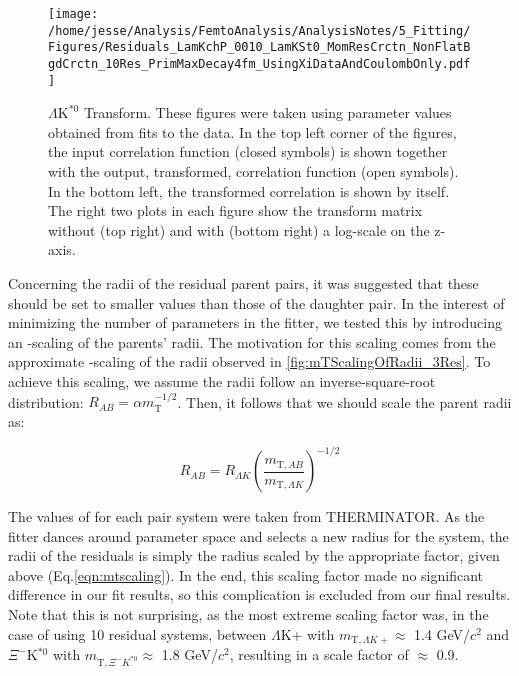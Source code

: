 \documentclass[/home/jesse/Analysis/FemtoAnalysis/AnalysisNotes/AnalysisNoteJBuxton.tex]{subfiles}
\begin{document}
\begin{figure}[h]
  \centering
  \texttt{[image: /home/jesse/Analysis/FemtoAnalysis/AnalysisNotes/5\_Fitting/Figures/Residuals\_LamKchP\_0010\_LamKSt0\_MomResCrctn\_NonFlatBgdCrctn\_10Res\_PrimMaxDecay4fm\_UsingXiDataAndCoulombOnly.pdf]}
  \caption[$\Lambda\mathrm{K^{*0}}$ Transform]{$\Lambda\mathrm{K^{*0}}$ Transform.  These figures were taken using parameter values obtained from fits to the data.  In the top left corner of the figures, the input correlation function (closed symbols) is shown together with the output, transformed, correlation function (open symbols).  In the bottom left, the transformed correlation is shown by itself.  The right two plots in each figure show the transform matrix without (top right) and with (bottom right) a log-scale on the z-axis.}
  \label{fig:LamKSt0toLamKchPTransform}
\end{figure}



Concerning the radii of the residual parent pairs, it was suggested that these should be set to smaller values than those of the daughter pair.  In the interest of minimizing the number of parameters in the fitter, we tested this by introducing an \mt-scaling of the parents' radii.  The motivation for this scaling comes from the approximate \mt-scaling of the radii observed in \ref{fig:mTScalingOfRadii_3Res}.  To achieve this scaling, we assume the radii follow an inverse-square-root distribution: $R_{AB} = \alpha m_{\mathrm{T}}^{-1/2}$.  Then, it follows that we should scale the parent radii as:

\begin{equation}
R_{AB} = R_{\Lambda K}\left(\frac{m_{\mathrm{T},AB}}{m_{\mathrm{T},\Lambda K}}\right)^{-1/2}
\label{eqn:mtscaling}
\end{equation}

The values of \mt for each pair system were taken from THERMINATOR.  As the fitter dances around parameter space and selects a new radius for the \LamK system, the radii of the residuals is simply the \LamK radius scaled by the appropriate factor, given above (Eq.\ref{eqn:mtscaling}).  In the end, this scaling factor made no significant difference in our fit results, so this complication is excluded from our final results.  Note that this is not surprising, as the most extreme scaling factor was, in the case of using 10 residual systems, between $\Lambda$K+ with $m_{\mathrm{T},\Lambda K+} \approx$ 1.4 GeV/$c^{2}$ and $\Xi^{-}$K$^{*0}$ with $m_{\mathrm{T},\Xi^{-} K^{*0}} \approx$ 1.8 GeV/$c^{2}$, resulting in a scale factor of $\approx$ 0.9.

\clearpage
\end{document}
